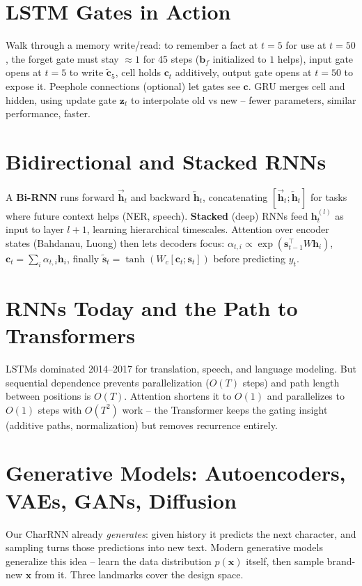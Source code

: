 \section{LSTM Gates in Action}
Walk through a memory write/read: to remember a fact at $t=5$ for use at $t=50$,
the forget gate must stay $\approx1$ for 45 steps ($\mathbf{b}_f$ initialized to
$1$ helps), input gate opens at $t=5$ to write $\tilde{\mathbf{c}}_5$, cell
holds $\mathbf{c}_t$ additively, output gate opens at $t=50$ to expose it.
Peephole connections (optional) let gates see $\mathbf{c}$. GRU merges cell and
hidden, using update gate $\mathbf{z}_t$ to interpolate old vs new -- fewer
parameters, similar performance, faster.

\section{Bidirectional and Stacked RNNs}
A \textbf{Bi-RNN} runs forward $\overrightarrow{\mathbf{h}}_t$ and backward
$\overleftarrow{\mathbf{h}}_t$, concatenating $[\overrightarrow{\mathbf{h}}_t;
\overleftarrow{\mathbf{h}}_t]$ for tasks where future context helps (NER, speech).
\textbf{Stacked} (deep) RNNs feed $\mathbf{h}^{(l)}_t$ as input to layer $l+1$,
learning hierarchical timescales. Attention over encoder states (Bahdanau,
Luong) then lets decoders focus: $\alpha_{t,i}\propto\exp(\mathbf{s}_{t-1}^{\top}W\mathbf{h}_i)$,
$\mathbf{c}_t=\sum_i\alpha_{t,i}\mathbf{h}_i$, finally $\tilde{\mathbf{s}}_t=
\tanh(W_c[\mathbf{c}_t;\mathbf{s}_t])$ before predicting $y_t$.

\section{RNNs Today and the Path to Transformers}
LSTMs dominated 2014--2017 for translation, speech, and language modeling.
But sequential dependence prevents parallelization ($O(T)$ steps) and path length
between positions is $O(T)$. Attention shortens it to $O(1)$ and parallelizes
to $O(1)$ steps with $O(T^2)$ work -- the Transformer keeps the gating insight
(additive paths, normalization) but removes recurrence entirely.

\section{Generative Models: Autoencoders, VAEs, GANs, Diffusion}
\label{sec:generative}
Our CharRNN already \emph{generates}: given history it predicts the next character, and sampling turns those predictions into new text. Modern generative models generalize this idea -- learn the data distribution $p(\mathbf{x})$ itself, then sample brand-new $\mathbf{x}$ from it. Three landmarks cover the design space.
